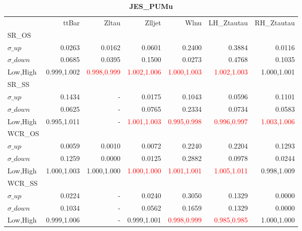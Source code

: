 \documentclass[11pt,oneside,a4paper]{article}
\begin{document}
\begin{table}
\caption{\bf{JES\_PUMu}}
\centering
\begin{tabular}{lrrrrrr}
& ttBar & Zltau & Zlljet & Wlnu & LH\_Ztautau & RH\_Ztautau \\

SR\_OS &  &  &  &  &  &  \\
$\sigma\_up$ & 0.0263 & 0.0162 & 0.0601 & 0.2400 & 0.3884 & 0.0116 \\
$\sigma\_down$ & 0.0685 & 0.0395 & 0.1500 & 0.0273 & 0.4768 & 0.1035 \\
Low,High & 0.999,1.002 & \textcolor{red}{0.998,0.999} & \textcolor{red}{1.002,1.006} & \textcolor{red}{1.000,1.003} & \textcolor{red}{1.002,1.003} & 1.000,1.001 \\

\hline
SR\_SS &  &  &  &  &  &  \\
$\sigma\_up$ & 0.1434 & - & 0.0175 & 0.1043 & 0.0596 & 0.1101 \\
$\sigma\_down$ & 0.0625 & - & 0.0765 & 0.2334 & 0.0734 & 0.0583 \\
Low,High & 0.995,1.011 & - & \textcolor{red}{1.001,1.003} & \textcolor{red}{0.995,0.998} & \textcolor{red}{0.996,0.997} & \textcolor{red}{1.003,1.006} \\

\hline
WCR\_OS &  &  &  &  &  &  \\
$\sigma\_up$ & 0.0059 & 0.0010 & 0.0072 & 0.2240 & 0.2204 & 0.1293 \\
$\sigma\_down$ & 0.1259 & 0.0000 & 0.0125 & 0.2882 & 0.0978 & 0.0244 \\
Low,High & 1.000,1.003 & 1.000,1.000 & \textcolor{red}{1.000,1.000} & \textcolor{red}{1.001,1.001} & \textcolor{red}{1.005,1.011} & 0.998,1.009 \\

\hline
WCR\_SS &  &  &  &  &  &  \\
$\sigma\_up$ & 0.0224 & - & 0.0240 & 0.3050 & 0.1329 & 0.0000 \\
$\sigma\_down$ & 0.1034 & - & 0.0562 & 0.1659 & 0.1329 & 0.0000 \\
Low,High & 0.999,1.006 & - & 0.999,1.001 & \textcolor{red}{0.998,0.999} & \textcolor{red}{0.985,0.985} & 1.000,1.000 \\

\end{tabular}
\end{table}
\end{document}

